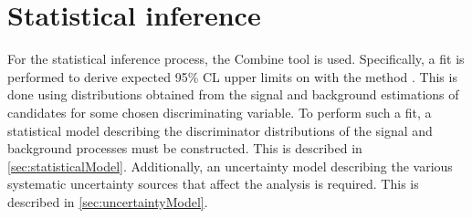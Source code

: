 \section{Statistical inference}
\label{sec:StatisticalEvaluation}
For the statistical inference process, the \textsf{Combine} \cite{CMSCombine} tool is used. Specifically, a fit is performed to derive expected 95\% CL upper limits on \sBR with the \CLs method \cite{CLs}. This is done using distributions obtained from the signal and background estimations of \cHZZ candidates for some chosen discriminating variable. To perform such a fit, a statistical model describing the discriminator distributions of the signal and background processes must be constructed. This is described in \autoref{sec:statisticalModel}. Additionally, an uncertainty model describing the various systematic uncertainty sources that affect the analysis is required. This is described in \autoref{sec:uncertaintyModel}.
